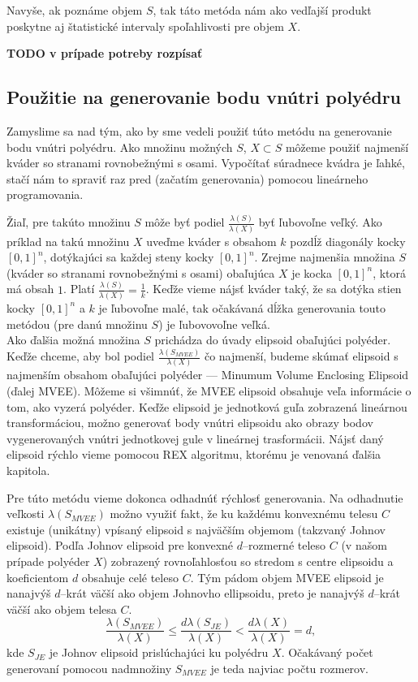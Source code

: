 Navyše, ak poznáme objem $S$, tak táto metóda nám ako vedľajší produkt poskytne aj štatistické intervaly spoľahlivosti pre objem $X$.

\textbf{TODO v prípade potreby rozpísať}

\subsection{Použitie na generovanie bodu vnútri polyédru}

Zamyslime sa nad tým, ako by sme vedeli použiť túto metódu na generovanie bodu vnútri polyédru. Ako množinu možných $S$, $X \subset S$ môžeme použiť najmenší kváder so stranami rovnobežnými s osami. Vypočítať súradnece kvádra je ľahké, stačí nám to spraviť raz pred (začatím generovania) pomocou lineárneho programovania.

Žiaľ, pre takúto množinu $S$ môže byť podiel $\frac{\lambda(S)}{\lambda(X)}$ byť ľubovoľne veľký. Ako príklad na takú množinu $X$ uveďme kváder s obsahom $k$ pozdĺž diagonály kocky $[0,1]^n$, dotýkajúci sa každej steny kocky $[0,1]^n$. Zrejme najmenšia množina $S$ (kváder so stranami rovnobežnými s osami) obaľujúca $X$ je kocka $[0,1]^n$, ktorá má obsah $1$. Platí $\frac{\lambda(S)}{\lambda(X)}=\frac{1}{k}$. Keďže vieme nájsť kváder taký, že sa dotýka stien kocky $[0,1]^n$ a $k$ je ľubovoľne malé, tak očakávaná dĺžka generovania touto metódou (pre danú množinu $S$) je ľubovovoľne veľká.\\

Ako ďalšia možná množina $S$ prichádza do úvady elipsoid obaľujúci polyéder. Keďže chceme, aby bol podiel $\frac{\lambda(S_{MVEE})}{\lambda(X)}$ čo najmenší, budeme skúmať elipsoid s najmenším obsahom obaľujúci polyéder --- Minumum Volume Enclosing Elipsoid (ďalej MVEE). Môžeme si všimnúť, že MVEE elipsoid obsahuje veľa informácie o tom, ako vyzerá polyéder. Keďže elipsoid je jednotková guľa zobrazená lineárnou transformáciou, možno generovať body vnútri elipsoidu ako obrazy bodov vygenerovaných vnútri jednotkovej gule v lineárnej trasformácii. Nájsť daný elipsoid rýchlo vieme pomocou REX algoritmu, ktorému je venovaná ďalšia kapitola.

Pre túto metódu vieme dokonca odhadnúť rýchlosť generovania. Na odhadnutie veľkosti $\lambda(S_{MVEE})$ možno využiť fakt, že ku každému konvexnému telesu $C$ existuje (unikátny) vpísaný elipsoid s najväčším objemom (takzvaný Johnov elipsoid). Podľa \cite{ellipsoids_ball} Johnov elipsoid pre konvexné $d$--rozmerné teleso $C$ (v našom prípade polyéder $X$) zobrazený rovnoľahlosťou so stredom s centre elipsoidu a koeficientom $d$ obsahuje celé teleso $C$. Tým pádom objem MVEE elipsoid je nanajvýš $d$--krát väčší ako objem Johnovho ellipsoidu, preto je nanajvýš $d$--krát väčší ako objem telesa $C$.
$$\frac {\lambda(S_{MVEE})}{\lambda(X)} \leq \frac{d\lambda(S_{JE})}{\lambda(X)} < \frac{d\lambda(X)}{\lambda(X)}=d,$$ kde $S_{JE}$ je Johnov elipsoid prislúchajúci ku polyédru $X$. Očakávaný počet generovaní pomocou nadmnožiny $S_{MVEE}$ je teda najviac počtu rozmerov.\\

